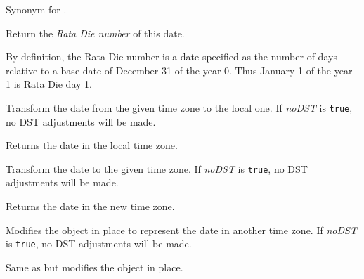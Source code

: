 \label{wxdatetimegetmjd}


Synonym for .


\label{wxdatetimegetratadie}


Return the {\it Rata Die number} of this date.

By definition, the Rata Die number is a date specified as the number of days
relative to a base date of December 31 of the year 0. Thus January 1 of the
year 1 is Rata Die day 1.



\label{wxdatetimefromtimezone}


Transform the date from the given time zone to the local one. If {\it noDST} is 
{\tt true}, no DST adjustments will be made.

Returns the date in the local time zone.


\label{wxdatetimetotimezone}


Transform the date to the given time zone. If {\it noDST} is {\tt true}, no
DST adjustments will be made.

Returns the date in the new time zone.


\label{wxdatetimemaketimezone}


Modifies the object in place to represent the date in another time zone. If
{\it noDST} is {\tt true}, no DST adjustments will be made.


\label{wxdatetimemakefromtimezone}


Same as  but modifies the object
in place.


